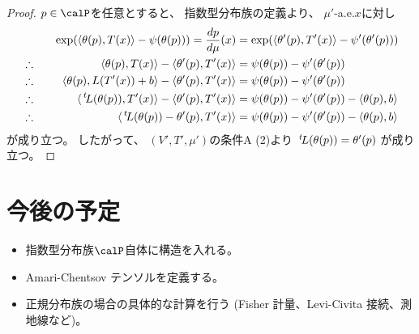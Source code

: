 \documentclass[report]{jlreq}
\begin{document}
\begin{proof}
    $p \in \calP$を任意とすると、
    指数型分布族の定義より、
    $\mu'$-a.e.$x$に対し
    \begin{alignat}{2}
        &\phantom{\therefore} \quad&
            \exp(\myangle{\theta(p)}{T(x)} - \psi(\theta(p)))
                =
                    \dd[p]{\mu}(x)
                &=
                    \exp(\myangle{\theta'(p)}{T'(x)} - \psi'(\theta'(p)))
            \\
        &\therefore \quad&
            \myangle{\theta(p)}{T(x)}
                - \myangle{\theta'(p)}{T'(x)}
                &=
                    \psi(\theta(p))
                    - \psi'(\theta'(p))
            \\
        &\therefore \quad&
            \myangle{\theta(p)}{L(T'(x)) + b}
            - \myangle{\theta'(p)}{T'(x)}
            &=
                \psi(\theta(p)) - \psi'(\theta'(p))
                \\
        &\therefore \quad&
            \myanglem{\up{t}L(\theta(p))}{T'(x)}
            - \myangle{\theta'(p)}{T'(x)}
            &=
                \psi(\theta(p)) - \psi'(\theta'(p))
                - \myangle{\theta(p)}{b}
                \\
        &\therefore \quad&
            \myanglem{\up{t}L(\theta(p)) - \theta'(p)}{T'(x)}
            &=
                \psi(\theta(p)) - \psi'(\theta'(p))
                - \myangle{\theta(p)}{b}
    \end{alignat}
    が成り立つ。
    したがって、
    $(V', T', \mu')$の条件A (2)より
    $\,{}^{t}\!L(\theta(p)) = \theta'(p)$
    が成り立つ。
\end{proof}


%
\section*{今後の予定}

\begin{itemize}
    \item 指数型分布族$\calP$自体に構造を入れる。
    \item Amari-Chentsov テンソルを定義する。
    \item 正規分布族の場合の具体的な計算を行う
        (Fisher 計量、Levi-Civita 接続、測地線など)。
\end{itemize}

%
\end{document}
